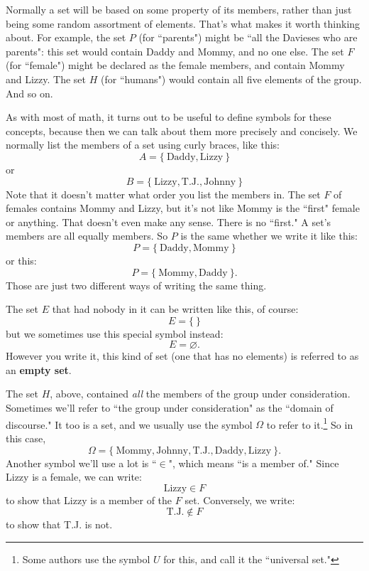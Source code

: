 Normally a set will be based on some property of its members, rather than
just being some random assortment of elements. That's what makes it worth
thinking about.  For example, the set $P$ (for ``parents") might be ``all
the Davieses who are parents": this set would contain Daddy and Mommy, and
no one else. The set $F$ (for ``female") might be declared as the female
members, and contain Mommy and Lizzy. The set $H$ (for ``humans") would
contain all five elements of the group. And so on.

As with most of math, it turns out to be useful to define symbols for these
concepts, because then we can talk about them more precisely and concisely.
We normally list the members of a set using curly braces, like this:
\[
A = \{~\text{Daddy}, \text{Lizzy}~\}
\]
or
\[
B = \{~\text{Lizzy}, \text{T.J.}, \text{Johnny}~\}
\]
Note that it doesn't matter what order you list the members in. The set
$F$ of females contains Mommy and Lizzy, but it's not like Mommy is the
``first" female or anything. That doesn't even make any sense. There is no
``first." A set's members are all equally members. So $P$ is the same
whether we write it like this:
\[
P = \{~\text{Daddy}, \text{Mommy}~\}
\]
or this:
\[
P = \{~\text{Mommy}, \text{Daddy}~\}.
\]
Those are just two different ways of writing the same thing.

The set $E$ that had nobody in it can be written like this, of course:
\[
E = \{~\}
\]
but we sometimes use this special symbol instead:
\[
E = \varnothing.
\]
However you write it, this kind of set (one that has no elements) is
referred to as an \textbf{empty set}.

The set $H$, above, contained \textit{all} the members of the group under
consideration. Sometimes we'll refer to ``the group under consideration" as
the ``domain of discourse."  It too is a set, and we usually use the symbol
$\Omega$ to refer to it.\footnote{Some authors use the symbol $U$ for this,
and call it the ``universal set."} So in this case,
\[
\Omega = \{~\text{Mommy}, \text{Johnny}, \text{T.J.}, \text{Daddy},
\text{Lizzy}~\}.
\]
Another symbol we'll use a lot is ``$\in$", which means ``is a member
of."  Since Lizzy is a female, we can write:
\[
\text{Lizzy} \in F
\]
to show that Lizzy is a member of the $F$ set. Conversely, we write:
\[
\text{T.J.} \notin F
\]
to show that T.J. is not. 


